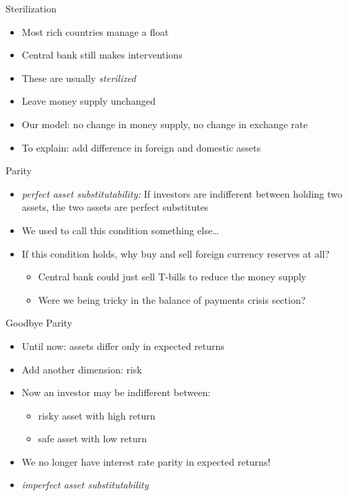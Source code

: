 \documentclass{beamer}
\begin{document}
\begin{frame}{Sterilization}

    \begin{itemize}
        \item Most rich countries manage a float 
        \item Central bank still makes interventions
        \item These are usually \emph{sterilized}
        \item Leave money supply unchanged
        \item Our model: no change in money supply, no change in exchange rate
        \item To explain: add difference in foreign and domestic assets
    \end{itemize}

\end{frame}

\begin{frame}{Parity}

    \begin{itemize}
        \item \emph{perfect asset substitutability:} If investors are indifferent between holding two assets, the two assets are perfect substitutes
        \item We used to call this condition something else\dots
        \item If this condition holds, why buy and sell foreign currency reserves at all?
        \begin{itemize}
            \item Central bank could just sell T-bills to reduce the money supply
            \item Were we being tricky in the balance of payments crisis section? 
        \end{itemize}
    \end{itemize}

\end{frame}

\begin{frame}{Goodbye Parity}

    \begin{itemize}
        \item Until now: assets differ only in expected returns
        \item Add another dimension: risk
        \item Now an investor may be indifferent between: 
        \begin{itemize}
            \item risky asset with high return
            \item safe asset with low return
        \end{itemize}
        \item We no longer have interest rate parity in expected returns! 
        \item \emph{imperfect asset substitutability}
    \end{itemize}

\end{frame}
\end{document}
